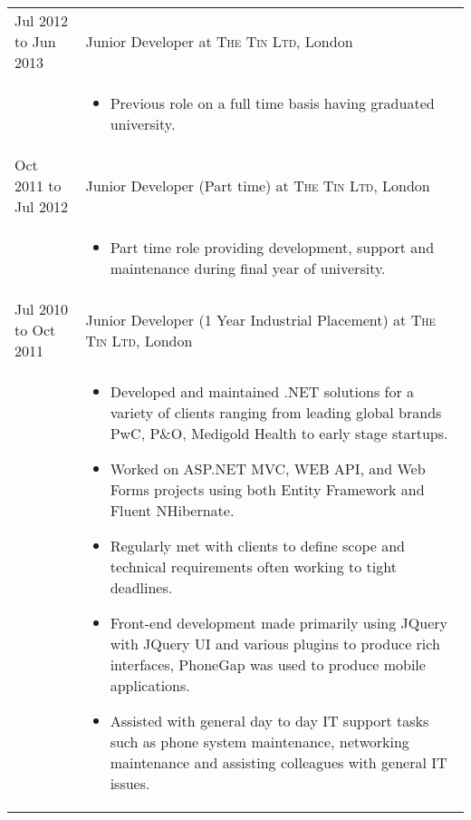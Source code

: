 \documentclass[a4paper,10pt]{article} %
\begin{document}
\begin{tabular}{ L{2cm} | L{11cm}}	
	Jul 2012 to Jun 2013 \newline & Junior Developer at \textsc{The Tin Ltd}, London \\	
	&\MPtrue
	\begin{itemize}[leftmargin=*]
		\item Previous role on a full time basis having graduated university. 
	\end{itemize} \\
	Oct 2011 to Jul 2012\newline & Junior Developer (Part time)  at \textsc{The Tin Ltd}, London \\

	&\MPtrue
	\begin{itemize}[leftmargin=*]
		\item Part time role providing development, support and maintenance during final year of university.
	\end{itemize} \\
	Jul 2010 to Oct 2011 & Junior Developer (1 Year Industrial Placement) at \textsc{The Tin Ltd}, London \\

	&\MPtrue
	\begin{itemize}[leftmargin=*]
		\item Developed and maintained .NET solutions for a variety of clients ranging from leading global brands PwC, P\&O, Medigold Health to early stage startups.
		\item Worked on ASP.NET MVC, WEB API, and Web Forms projects using both Entity Framework and Fluent NHibernate.
		\item Regularly met with clients to define scope and technical requirements often working to tight deadlines. 
		\item Front-end development made primarily using JQuery with JQuery UI and various plugins to produce rich interfaces, PhoneGap was used to produce mobile applications. 
		\item Assisted with general day to day IT support tasks such as phone system maintenance, networking maintenance and assisting colleagues with general IT issues.
	\end{itemize} \\
\end{tabular}
\end{document}
